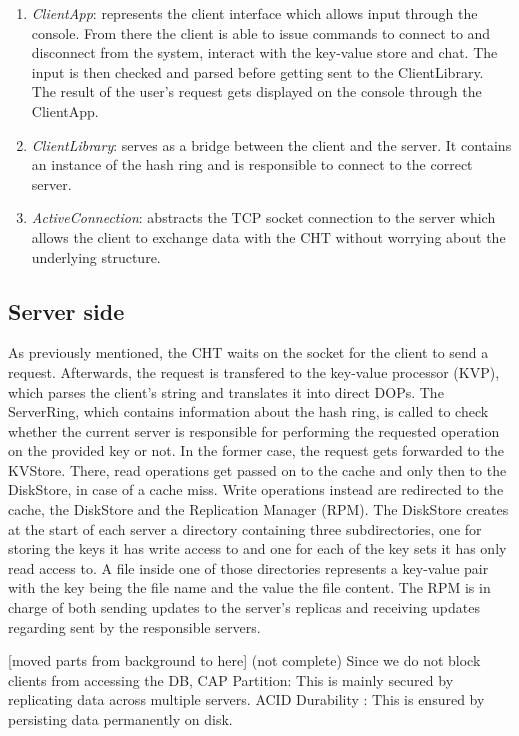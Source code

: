 \begin{enumerate} 
  \item \textit{ClientApp}: represents the client interface which allows input through the console. From there the client is able to issue commands to connect to and disconnect from the system, interact with the key-value store and chat. The input is then checked and parsed before getting sent to the ClientLibrary. The result of the user's request gets displayed on the console through the ClientApp.
  \item \textit{ClientLibrary}: serves as a bridge between the client and the server. It contains an instance of the hash ring and is responsible to connect to the correct server.
  \item \textit{ActiveConnection}: abstracts the TCP socket connection to the server which allows the client to exchange data with the CHT without worrying about the underlying structure.
\end{enumerate}
 
\subsection{Server side}

As previously mentioned, the CHT waits on the socket for the client to send a request. Afterwards, the request is transfered to the key-value processor (KVP), which parses the client's string and translates it into direct DOPs. The ServerRing, which contains information about the hash ring, is called to check whether the current server is responsible for performing the requested operation on the provided key or not. In the former case, the request gets forwarded to the KVStore. There, read operations get passed on to the cache and only then to the DiskStore, in case of a cache miss. Write operations instead are redirected to the cache, the DiskStore and the Replication Manager (RPM). The DiskStore creates at the start of each server a directory containing three subdirectories, one for storing the keys it has write access to and one for each of the key sets it has only read access to. A file inside one of those directories represents a key-value pair with the key being the file name and the value the file content.
The RPM is in charge of both sending updates to the server's replicas and receiving updates regarding sent by the responsible servers.

[moved parts from background to here] (not complete)
Since we do not block clients from accessing the DB, 
CAP Partition: This is mainly secured by replicating data across multiple servers.
ACID Durability : This is ensured by persisting data permanently on disk.

